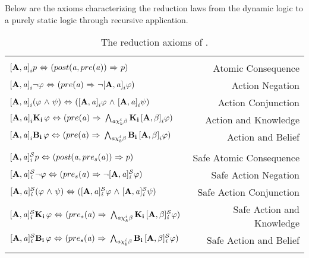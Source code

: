 Below are the axioms characterizing the reduction laws from the dynamic logic to a purely static logic through recursive application.\\
\begin{table}[H]
	\begin{center}
		\begin{tabular}{| l r |}
			\hline & \\
			$\Pal{A,\laa}p \iiff (post(\laa, pre(\laa)) \iimplies p)$ & Atomic Consequence\\
			$\Pal{A,\laa}\tlnot \varphi \iiff (pre(\laa) \iimplies \tlnot \Pal{A,\laa}\varphi)$ & Action Negation\\
			$\Pal{A,\laa}(\varphi \tland \psi) \iiff (\Pal{A,\laa}\varphi \tland \Pal{A,\laa}\psi)$ & Action Conjunction\\
			$\Pal{A,\laa}\Kns{i}\varphi \iiff (pre(\laa)\iimplies \bigwedge_{\laa\chi_{k}^i\beta}\Kns{i}\Pal{A,\beta}\varphi)$ & Action and Knowledge\\
			$\Pal{A,\laa}\Bels{i}\varphi \iiff (pre(\laa)\iimplies \bigwedge_{\laa\chi_{b}^i\beta}\Bels{i}\Pal{A,\beta}\varphi)$ & Action and Belief\\ 
			&\\
			$\SPal{A,\laa}p \iiff (post(\laa, pre_s(\laa)) \iimplies p)$ & Safe Atomic Consequence\\
			$\SPal{A,\laa}\tlnot \varphi \iiff (pre_s(\laa) \iimplies \tlnot \SPal{A,\laa}\varphi)$ & Safe Action Negation\\
			$\SPal{A,\laa}(\varphi \tland \psi) \iiff (\SPal{A,\laa}\varphi \tland \SPal{A,\laa}\psi)$ & Safe Action Conjunction\\
			$\SPal{A,\laa}\Kns{i}\varphi \iiff (pre_s(\laa)\iimplies \bigwedge_{\laa\chi_{k}^i\beta}\Kns{i}\SPal{A,\beta}\varphi)$ & Safe Action and Knowledge\\
			$\SPal{A,\laa}\Bels{i}\varphi \iiff (pre_s(\laa)\iimplies \bigwedge_{\laa\chi_{b}^i\beta}\Bels{i}\SPal{A,\beta}\varphi)$ & Safe Action and Belief\\ 
			&\\
			\hline
		\end{tabular}
		\caption{The reduction axioms of \DASL.}
	\end{center}
\end{table}

